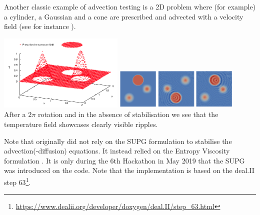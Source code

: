 Another classic example of advection testing is a 2D problem where (for example) a cylinder, a Gaussian 
and a cone are prescribed and advected with a velocity field (see for instance \cite{dohu03}). 

\begin{center}
\includegraphics[width=0.45\textwidth]{images/supg/supg1}
\includegraphics[width=0.45\textwidth]{images/supg/supg2}\\
{\captionfont After a $2\pi$ rotation and in the absence of stabilisation we see that the temperature field
showcases clearly visible ripples.}
\end{center}

\begin{remark}
Note that \aspect{} originally did not rely on the SUPG formulation to stabilise the 
advection(-diffusion) equations\cite{krhb12}. It instead relied on the Entropy Viscosity
formulation \cite{gupp10,gupp11}.
It is only during the 6th Hackathon in May 2019 that the SUPG was introduced on the code.
Note that the \aspect{} implementation is based on the deal.II step 
63\footnote{\url{https://www.dealii.org/developer/doxygen/deal.II/step_63.html}}.
\end{remark}





